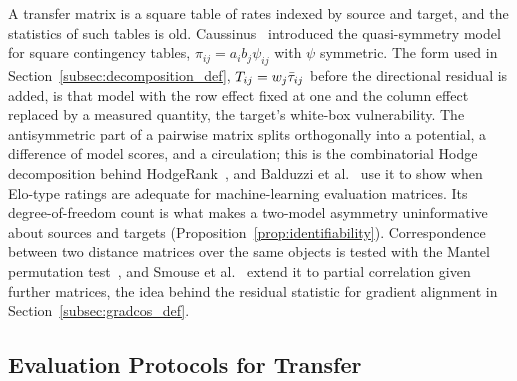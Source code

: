A transfer matrix is a square table of rates indexed by source and target, and the statistics of such tables is old. Caussinus~\cite{caussinus1965contribution} introduced the quasi-symmetry model for square contingency tables, $\pi_{ij} = a_i b_j \psi_{ij}$ with $\psi$ symmetric. The form used in Section~\ref{subsec:decomposition_def}, $T_{ij} = w_j \bar{\tau}_{ij}$ before the directional residual is added, is that model with the row effect fixed at one and the column effect replaced by a measured quantity, the target's white-box vulnerability. The antisymmetric part of a pairwise matrix splits orthogonally into a potential, a difference of model scores, and a circulation; this is the combinatorial Hodge decomposition behind HodgeRank~\cite{jiang2011statistical}, and Balduzzi et al.~\cite{balduzzi2018reevaluating} use it to show when Elo-type ratings are adequate for machine-learning evaluation matrices. Its degree-of-freedom count is what makes a two-model asymmetry uninformative about sources and targets (Proposition~\ref{prop:identifiability}). Correspondence between two distance matrices over the same objects is tested with the Mantel permutation test~\cite{mantel1967detection}, and Smouse et al.~\cite{smouse1986multiple} extend it to partial correlation given further matrices, the idea behind the residual statistic for gradient alignment in Section~\ref{subsec:gradcos_def}.

\subsection{Evaluation Protocols for Transfer}
\label{subsec:rw_protocols}

